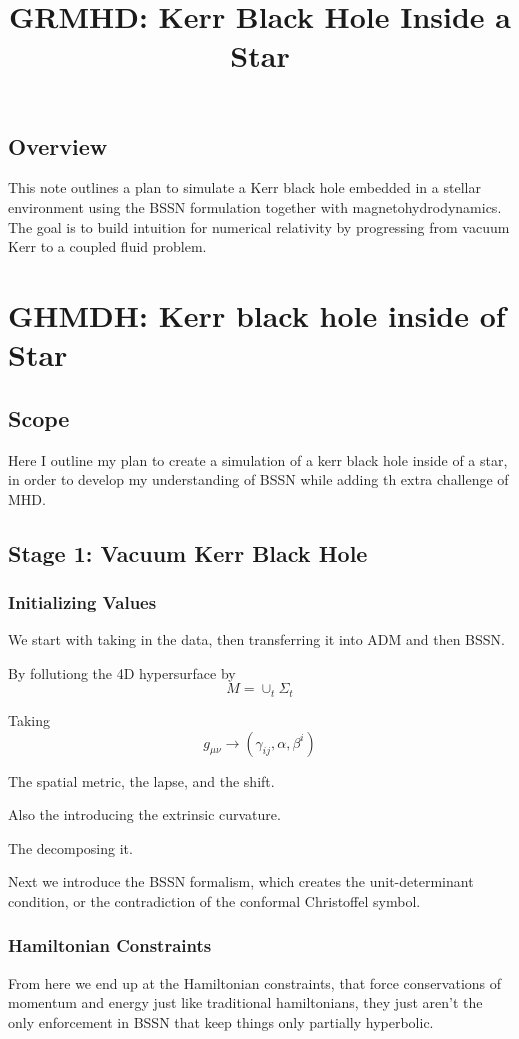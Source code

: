 \title{GRMHD: Kerr Black Hole Inside a Star}

\section{Overview}
This note outlines a plan to simulate a Kerr black hole embedded in a stellar environment using the BSSN formulation together with magnetohydrodynamics. The goal is to build intuition for numerical relativity by progressing from vacuum Kerr to a coupled fluid problem.

\chapter{GHMDH: Kerr black hole inside of Star}

\section{Scope}

Here I outline my plan to create a simulation of a kerr black hole inside of a star, in order to develop my understanding of BSSN while adding th extra challenge of MHD.

\section{Stage 1: Vacuum Kerr Black Hole}
\subsection{Initializing Values}
We start with taking in the data, then transferring it into ADM and then BSSN.

By follutiong the 4D hypersurface by
\[
M = \cup_t \Sigma_t
  \]

  Taking
\[
g_{\mu \nu} \to (\gamma_{ij}, \alpha, \beta^i)
  \]

  The spatial metric, the lapse, and the shift.

  Also the introducing the extrinsic curvature.

  The decomposing it.

  Next we introduce the BSSN formalism, which creates the unit-determinant condition, or the contradiction of the conformal Christoffel symbol.

\subsection{Hamiltonian Constraints}
  From here we end up at the Hamiltonian constraints, that force conservations of momentum and energy just like traditional hamiltonians, they just aren't the only enforcement in BSSN that keep things only partially hyperbolic.


